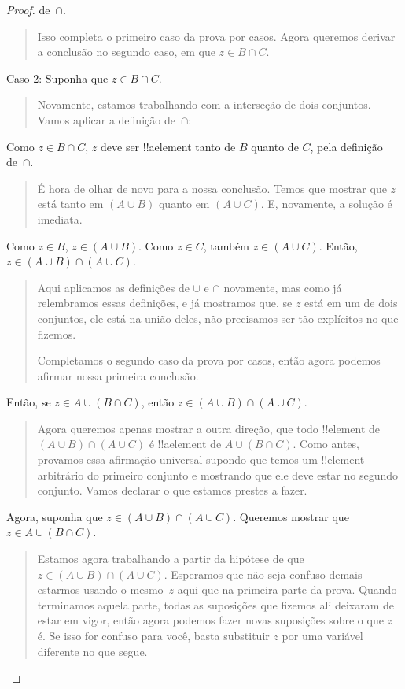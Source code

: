 \documentclass[../../../include/open-logic-section]{subfiles}
\begin{document}
\begin{proof}
de~$\cap$.
\begin{quote}
Isso completa o primeiro caso da prova por casos. Agora queremos
derivar a conclusão no segundo caso, em que $z \in B \cap C$.
\end{quote}
Caso 2: Suponha que $z \in B \cap C$.
\begin{quote}
Novamente, estamos trabalhando com a interseção de dois conjuntos. Vamos aplicar
a definição de~$\cap$:
\end{quote}
Como $z \in B \cap C$, $z$ deve ser !!a{element} tanto de $B$ quanto de $C$, pela
definição de~$\cap$.
\begin{quote}
É hora de olhar de novo para a nossa conclusão. Temos que mostrar que $z$ está
tanto em $(A \cup B)$ quanto em $(A \cup C)$. E, novamente, a solução é
imediata.
\end{quote}
Como $z \in B$, $z \in (A \cup B)$. Como $z \in C$, também $z \in (A
\cup C)$.  Então, $z \in (A \cup B) \cap (A \cup C)$.
\begin{quote}
Aqui aplicamos as definições de $\cup$ e $\cap$ novamente, mas como
já relembramos essas definições, e já mostramos que, se
$z$ está em um de dois conjuntos, ele está na união deles, não precisamos ser tão
explícitos no que fizemos.

Completamos o segundo caso da prova por casos, então agora podemos
afirmar nossa primeira conclusão.
\end{quote}
Então, se $z \in A \cup (B \cap C)$, então $z \in (A \cup B) \cap (A \cup C)$.
\begin{quote}
Agora queremos apenas mostrar a outra direção, que todo !!{element}
de $(A \cup B) \cap (A \cup C)$ é !!a{element} de $A \cup (B \cap
C)$. Como antes, provamos essa afirmação universal supondo que temos um
!!{element} arbitrário do primeiro conjunto e mostrando que ele deve estar no
segundo conjunto. Vamos declarar o que estamos prestes a fazer.
\end{quote}
Agora, suponha que $z \in (A \cup B) \cap (A \cup C)$. Queremos mostrar
que $z \in A \cup (B \cap C)$.
\begin{quote}
Estamos agora trabalhando a partir da hipótese de que $z \in (A \cup B) \cap (A
\cup C)$. Esperamos que não seja confuso demais estarmos usando o
mesmo~$z$ aqui que na primeira parte da prova.  Quando terminamos
aquela parte, todas as suposições que fizemos ali deixaram de estar em
vigor, então agora podemos fazer novas suposições sobre o que $z$ é.  Se isso
for confuso para você, basta substituir $z$ por uma variável diferente no
que segue.


\end{quote}
\end{proof}
\end{document}
